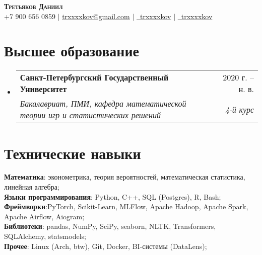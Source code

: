 \documentclass[a4paper, 11pt]{article}
\makeatletter
\newcommand{\resumeSubheading}[4]{
  \vspace{-2pt}\item
    \begin{tabular*}{0.97\textwidth}[t]{l@{\extracolsep{\fill}}r}
      \textbf{#1} & #2 \\
      \textit{\small#3} & \textit{\small #4} \\
    \end{tabular*}\vspace{-7pt}
}
\newcommand{\resumeSubHeadingListStart}{\begin{itemize}[leftmargin=0.15in, label={}]}
\newcommand{\resumeSubHeadingListEnd}{\end{itemize}}
\makeatother
\begin{document}
\begin{center}
    \textbf{\Huge \scshape Третьяков Даниил} \\ \vspace{5pt}
    \small +7 900 656 0859 $|$ \href{mailto:trxxxxkov@gmail.com}{trxxxxkov@gmail.com} $|$
    \href{https://t.me/trxxxxkov}{\faTelegram \ trxxxxkov} $|$  \href{https://github.com/trxxxxkov}{\faGithub \ trxxxxkov}
\end{center}


\section{Высшее образование}
  \resumeSubHeadingListStart
    \resumeSubheading
      {Санкт-Петербургский Государственный Университет}{2020 г. -- н. в.}
      {Бакалавриат, ПМИ, кафедра математической теории игр и статистических решений}
      {4-й курс}
  \resumeSubHeadingListEnd


\section{Технические навыки}
 \begin{itemize}[leftmargin=0.15in, label={}]
    \small{\item{
        \textbf{Математика}{: эконометрика, теория вероятностей, математическая статистика, линейная алгебра;} \\    
        \vspace{3pt}
        \textbf{Языки программирования}{: Python, C++, SQL (Postgres), R, Bash;} \\
        \vspace{3pt}
        \textbf{Фреймворки}{:PyTorch, Scikit-Learn, MLFlow, Apache Hadoop, Apache Spark, Apache Airflow, Aiogram;} \\
        \vspace{3pt}
        \textbf{Библиотеки}{: pandas, NumPy, SciPy, seaborn, NLTK, Transformers, SQLAlchemy, statsmodels;} \\
        \vspace{3pt}
        \textbf{Прочее}{: Linux (Arch, btw), Git, Docker, BI-системы (DataLens);} \\
    }}
 \end{itemize}

\end{document}
